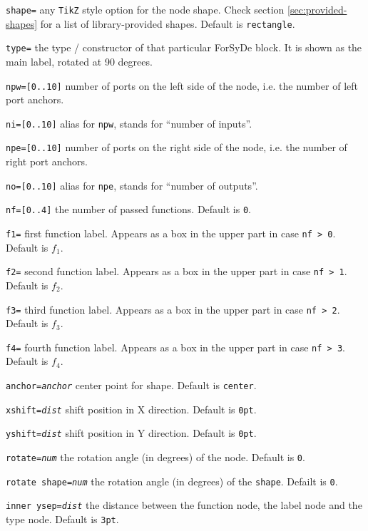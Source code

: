 \begin{optionslist}
\item \texttt{shape=} any \texttt{TikZ} style option for the node shape. Check section \ref{sec:provided-shapes} for a list of library-provided shapes. Default is \texttt{rectangle}.
\item \texttt{type=} the type / constructor of that particular ForSyDe block. It is shown as the main label, rotated at 90 degrees.
\item \texttt{npw=[0..10]} number of ports on the left side of the node, i.e. the number of left port anchors.
\item \texttt{ni=[0..10]} alias for \texttt{npw}, stands for ``number of inputs''.
\item \texttt{npe=[0..10]} number of ports on the right side of the node, i.e. the number of right port anchors.
\item \texttt{no=[0..10]} alias for \texttt{npe}, stands for ``number of outputs''.
\item \texttt{nf=[0..4]} the number of passed functions. Default is \texttt{0}.
\item \texttt{f1=} first function label. Appears as a box in the upper part in case \texttt{nf > 0}. Default is $f_1$.
\item \texttt{f2=} second function label. Appears as a box in the upper part in case \texttt{nf > 1}. Default is $f_2$.
\item \texttt{f3=} third function label. Appears as a box in the upper part in case \texttt{nf > 2}. Default is $f_3$.
\item \texttt{f4=} fourth function label. Appears as a box in the upper part in case \texttt{nf > 3}. Default is $f_4$.
\item \texttt{anchor=\it anchor} center point for shape. Default is \texttt{center}.
\item \texttt{xshift=\it dist} shift position in X direction. Default is \texttt{0pt}.
\item \texttt{yshift=\it dist} shift position in Y direction. Default is \texttt{0pt}.
\item \texttt{rotate=\it num} the rotation angle (in degrees) of the node. Default is \texttt{0}.
\item \texttt{rotate shape=\it num} the rotation angle (in degrees) of the \texttt{shape}. Defailt is \texttt{0}.
\item \texttt{inner ysep=\it dist} the distance between the function node, the label node and the type node. Default is \texttt{3pt}.
\end{optionslist}

